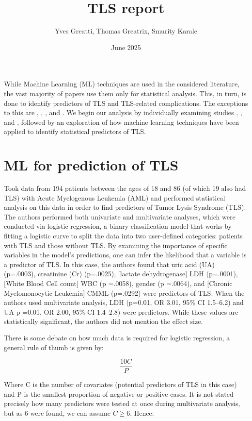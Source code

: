 \documentclass{article}
\title{TLS report}
\author{Yves Greatti, Thomas Greatrix, Smurity Karale}
\date{June 2025}
\begin{document}
\maketitle

While Machine Learning (ML) techniques are used in the considered literature, the vast majority of papers use them only for statistical analysis. This, in turn, is done to identify predictors of TLS and TLS-related complications. The exceptions to this are ,  \cite{montesinos2008tumor}, \cite{mato2004predictive}, and  \cite{xiao2024prediction}. We begin our analysis by individually examining studies \cite{montesinos2008tumor}, \cite{mato2004predictive}, and \cite{xiao2024prediction}, followed by an exploration of how machine learning techniques have been applied to identify statistical predictors of TLS.

\section{ML for prediction of TLS}

\cite{montesinos2008tumor} Took data from 194 patients between the ages of 18 and 86 (of which 19 also had TLS) with Acute Myelogenous Leukemia (AML) and performed statistical analysis on this data in order to find predictors of Tumor Lysis Syndrome (TLS). The authors performed both univariate and multivariate analyses, which were conducted via logistic regression, a binary classification model that works by fitting a logistic curve to split the data into two user-defined categories: patients with TLS and those without TLS. By examining the importance of specific variables in the model’s predictions, one can infer the likelihood that a variable is a predictor of TLS. In this case, the authors found that uric acid (UA) (p=.0003), creatinine (Cr) (p=.0025), [lactate dehydrogenase] LDH (p=.0001), [White Blood Cell count] WBC (p =.0058), gender (p =.0064), and [Chronic Myelomonocytic Leukemia] CMML (p=.0292) were predictors of TLS. When the authors used multivariate analysis, LDH (p=0.01, OR 3.01, 95\% CI 1.5–6.2) and UA p =0.01, OR 2.00, 95\% CI 1.4–2.8) were predictors. While these values are statistically significant, the authors did not mention the effect size.

There is some debate on how much data is required for logistic regression, a general rule of thumb is given by:

\[\frac{10C}{P}\]

Where C is the number of covariates (potential predictors of TLS in this case) and P is the smallest proportion of negative or positive cases. It is not stated precisely how many predictors were tested at once during multivariate analysis, but as 6 were found, we can assume \(C \geq 6\). Hence:
\end{document}

